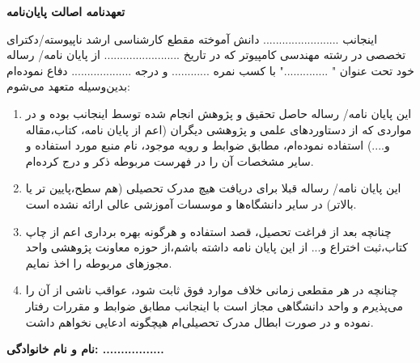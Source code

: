 \thispagestyle{empty}
\noindent

\textbf{\Large تعهدنامه اصالت  پایان‌نامه}
\vskip 1cm

\noindent اینجانب ........................ دانش آموخته مقطع کارشناسی ارشد ناپیوسته/دکترای تخصصی در رشته مهندسی کامپیوتر که در تاریخ ........................ از پایان نامه/ رساله خود تحت عنوان " .............." با کسب نمره ............ و درجه ................... دفاع نموده‌ام بدین‌وسیله متعهد می‌شوم:
\begin{enumerate}
	\item این پایان نامه/ رساله حاصل تحقیق و پژوهش انجام شده توسط اینجانب بوده و در مواردی که از دستاوردهای علمی و پژوهشی دیگران (اعم از پایان نامه، کتاب،مقاله و....) استفاده نموده‌ام، مطابق ضوابط و رویه موجود، نام منبع مورد استفاده و سایر مشخصات آن را در فهرست مربوطه ذکر و درج کرده‌ام.
	\item این پایان نامه/ رساله قبلا برای دریافت هیچ مدرک تحصیلی (هم سطح،پایین تر یا بالاتر) در سایر دانشگاه‌ها و موسسات آموزشی عالی ارائه نشده است.
	\item 	چنانچه بعد از فراغت تحصیل، قصد استفاده و هرگونه بهره برداری اعم از چاپ کتاب،ثبت اختراع و... از این پایان نامه داشته باشم،از حوزه معاونت پژوهشی واحد مجوزهای مربوطه را اخذ نمایم.
	\item 	چنانچه در هر مقطعی زمانی خلاف موارد فوق ثابت شود، عواقب ناشی از آن را می‌پذیرم و واحد دانشگاهی مجاز است با اینجانب مطابق ضوابط و مقررات رفتار نموده و در صورت ابطال مدرک تحصیلی‌ام هیچگونه ادعایی نخواهم داشت.
\end{enumerate}

\vskip 0.5cm
\begin{flushleft}
\textbf{نام و نام خانوادگی: .................}
\end{flushleft}